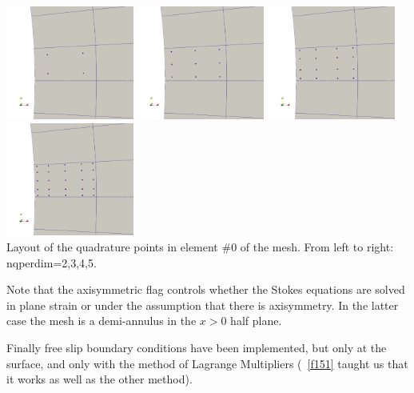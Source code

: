 \begin{center}
\includegraphics[width=4.2cm]{python_codes/fieldstone_152/images/nq4}
\includegraphics[width=4.2cm]{python_codes/fieldstone_152/images/nq9}
\includegraphics[width=4.2cm]{python_codes/fieldstone_152/images/nq16}
\includegraphics[width=4.2cm]{python_codes/fieldstone_152/images/nq25}\\
{\captionfont Layout of the quadrature points in element \#0 of the mesh. 
From left to right: {\python nqperdim=2,3,4,5}.} 
\end{center}

Note that the {\python axisymmetric} flag controls whether the Stokes equations 
are solved in plane strain or under the assumption that there is axisymmetry. 
In the latter case the mesh is a demi-annulus in the $x>0$ half plane.

Finally free slip boundary conditions have been implemented, but only at the 
surface, and only with the method of Lagrange Multipliers (\stone~\ref{f151}
taught us that it works as well as the other method).  


